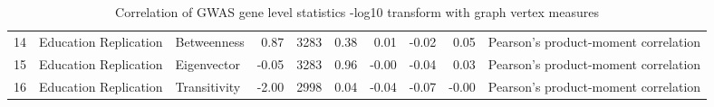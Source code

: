 \begin{table}[ht]
\begin{adjustbox}{max width=\textwidth}
\begin{tabular}{rllrlrrrrl}
  14 & Education Replication & Betweenness & 0.87 & 3283 & 0.38 & 0.01 & -0.02 & 0.05 & Pearson's product-moment correlation \\ 
  15 & Education Replication & Eigenvector & -0.05 & 3283 & 0.96 & -0.00 & -0.04 & 0.03 & Pearson's product-moment correlation \\ 
  16 & Education Replication & Transitivity & -2.00 & 2998 & 0.04 & -0.04 & -0.07 & -0.00 & Pearson's product-moment correlation \\ 
   \hline
\end{tabular}
\end{adjustbox}
\caption{Correlation of GWAS gene level statistics -log10 transform with graph vertex measures} 
\label{Table:Correlation of GWAS gene level statistics -log10 transform with graph vertex measures}
\end{table}


